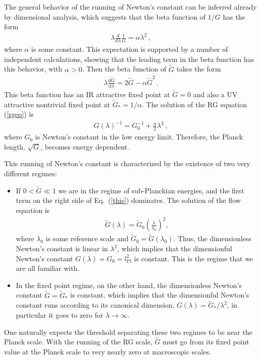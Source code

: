 \documentclass{article}
\def\beqn{\begin{eqnarray}}
\def\eeqn{\end{eqnarray}}
\begin{document}
The general behavior of the running of Newton's constant can be inferred already by
dimensional analysis, which suggests that the beta function of $1/G$ has the form 
\beqn
\lambda\frac{d}{d\lambda}\frac{1}{G}=\alpha \lambda^2 \,, \label{rgeq}
\eeqn
where $\alpha$ is some constant. This expectation is supported by a number of 
independent calculations, showing that the leading term in the beta function
has this behavior, with $\alpha>0$.
Then the beta function of $\tilde G$ takes the form
\beqn
\lambda\frac{d\tilde G}{d\lambda}=2\tilde G-\alpha \tilde G^2 \,.
\label{this}
\eeqn
This beta function has an IR attractive fixed point at $\tilde G=0$
and also a UV attractive nontrivial fixed point at $\tilde G_*=1/\alpha$.
The solution of the RG equation (\ref{rgeq}) is
\beqn
G(\lambda)^{-1} = G^{-1}_0 + \frac{\alpha}{2}  \lambda^2 \,, \label{gk}
\eeqn
where $G_0$ is Newton's constant in the low energy limit. Therefore, the Planck
length, $\sqrt{G}$, becomes energy dependent.  

This 
running of Newton's constant is characterized by the
existence of two very different regimes:

\begin{itemize}
\item If $0<\tilde G\ll 1$ we are in the regime of sub-Planckian energies, and
the first term on the right side of Eq.~(\ref{this}) dominates. The solution of the flow equation is
\beqn
\tilde G(\lambda)=\tilde G_0\left(\frac{\lambda}{\lambda_0}\right)^2 ,
\eeqn
where $\lambda_0$ is some reference scale and $\tilde G_0=\tilde G(\lambda_0)$.
Thus, the dimensionless Newton's constant is linear in $\lambda^2$,
which implies that the dimensionful Newton's constant $G(\lambda)=G_0 = l_{\mathrm{Pl}}^2$ is constant.
This is the regime that we are all familiar with.

\item In the fixed point regime, on the other hand, the dimensionless Newton's constant 
$\tilde G=\tilde G_*$ is constant, 
which implies that the dimensionful Newton's constant runs according to its
canonical dimension, $G(\lambda)=\tilde G_*/\lambda^2$, in particular it goes to zero
for $\lambda \to \infty$. 
\end{itemize}

One naturally expects the threshold separating these two regimes to be near the Planck scale.
With the running of the RG scale, $\tilde G$ must 
go from its fixed point value at the Planck scale to very nearly zero
at macroscopic scales.
\end{document}
